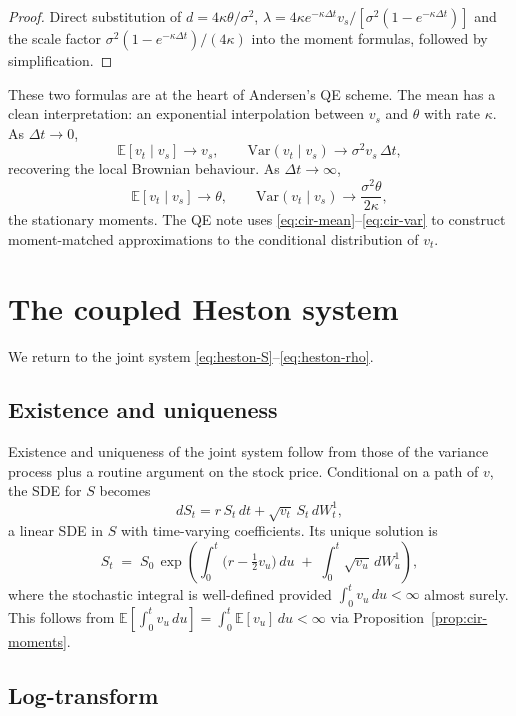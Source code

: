 \documentclass[11pt]{article}
\theoremstyle{plain}
\theoremstyle{definition}
\theoremstyle{remark}
\begin{document}
\begin{proof}
    Direct substitution of \(d = 4\kappa\theta/\sigma^2\), \(\lambda = 4\kappa e^{-\kappa\Delta t} v_s/[\sigma^2(1 - e^{-\kappa\Delta t})]\) and the scale factor \(\sigma^2(1 - e^{-\kappa\Delta t})/(4\kappa)\) into the moment formulas, followed by simplification.
\end{proof}

These two formulas are at the heart of Andersen's QE scheme. The mean has a clean interpretation: an exponential interpolation between \(v_s\) and \(\theta\) with rate \(\kappa\). As \(\Delta t \to 0\),
\[
    \mathbb{E}[v_t \mid v_s] \to v_s, \qquad \mathrm{Var}(v_t \mid v_s) \to \sigma^2 v_s\,\Delta t,
\]
recovering the local Brownian behaviour. As \(\Delta t \to \infty\),
\[
    \mathbb{E}[v_t \mid v_s] \to \theta, \qquad \mathrm{Var}(v_t \mid v_s) \to \frac{\sigma^2 \theta}{2\kappa},
\]
the stationary moments. The QE note uses \eqref{eq:cir-mean}--\eqref{eq:cir-var} to construct moment-matched approximations to the conditional distribution of \(v_t\).

\section{The coupled Heston system}

We return to the joint system \eqref{eq:heston-S}--\eqref{eq:heston-rho}.

\subsection{Existence and uniqueness}

Existence and uniqueness of the joint system follow from those of the variance process plus a routine argument on the stock price. Conditional on a path of \(v\), the SDE for \(S\) becomes
\[
    dS_t = r\,S_t\,dt + \sqrt{v_t}\,S_t\,dW^1_t,
\]
a linear SDE in \(S\) with time-varying coefficients. Its unique solution is
\[
    S_t \;=\; S_0\,\exp\!\left(\int_0^t \!\bigl(r - \tfrac12 v_u\bigr)\,du \;+\; \int_0^t \!\sqrt{v_u}\,dW^1_u\right),
\]
where the stochastic integral is well-defined provided \(\int_0^t v_u\,du < \infty\) almost surely. This follows from \(\mathbb{E}\!\left[\int_0^t v_u\,du\right] = \int_0^t \mathbb{E}[v_u]\,du < \infty\) via Proposition~\ref{prop:cir-moments}.

\subsection{Log-transform}
\end{document}
